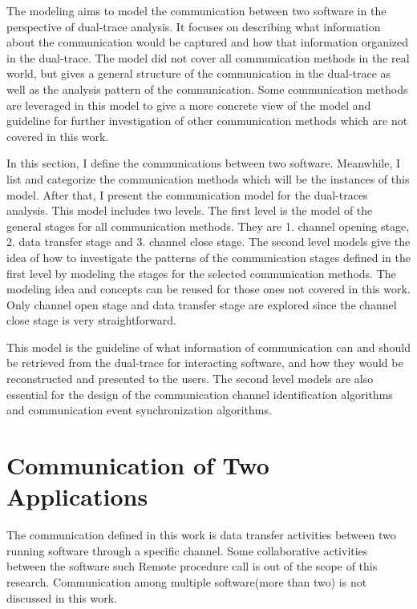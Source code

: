 

\label{chapter:Mod}
The modeling aims to model the communication between two software in the perspective of dual-trace analysis. It focuses on describing what information about the communication would be captured and how that information organized in the dual-trace. The model did not cover all communication methods in the real world, but gives a general structure of the communication in the dual-trace as well as the analysis pattern of the communication. Some communication methods are leveraged in this model to give a more concrete view of the model and guideline for further investigation of other communication methods which are not covered in this work.

In this section, I define the communications between two software. Meanwhile, I list and categorize the communication methods which will be the instances of this model. After that, I present the communication model for the dual-traces analysis. This model includes two levels. The first level is the model of the general stages for all communication methods. They are 1. channel opening stage, 2. data transfer stage and 3. channel close stage. The second level models give the idea of how to investigate the patterns of the communication stages defined in the first level by modeling the stages for the selected communication methods. The modeling idea and concepts can be reused for those ones not covered in this work. Only channel open stage and data transfer stage are explored since the channel close stage is very straightforward.

This model is the guideline of what information of communication can and should be retrieved from the dual-trace for interacting software, and how they would be reconstructed and presented to the users. The second level models are also essential for the design of the communication channel identification algorithms and communication event synchronization algorithms.

\section{Communication of Two Applications}   
The communication defined in this work is data transfer activities between two running software through a specific channel. Some collaborative activities between the software such Remote procedure call is out of the scope of this research. Communication among multiple software(more than two) is not discussed in this work.

